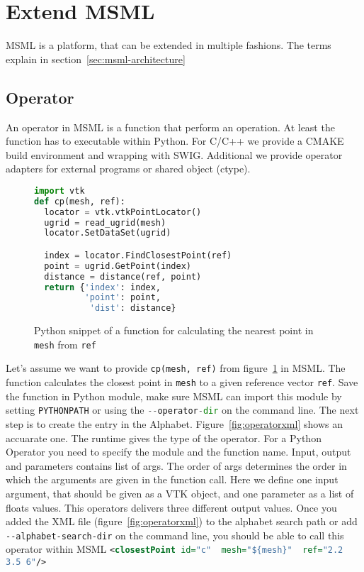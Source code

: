 \section{Extend MSML}
\label{sec:extend}

MSML is a platform, that can be extended in multiple fashions.
The terms explain in section~\ref{sec:msml-architecture}

\subsection{Operator}
\label{sec:operator}

An operator in MSML is a function that perform an operation. At least
the function has to executable within Python. For C/C++ we provide a
CMAKE build environment and wrapping with SWIG. Additional we provide
operator adapters for external programs or shared object (ctype).

\begin{figure}
  \centering
\begin{lstlisting}[language=Python]
import vtk
def cp(mesh, ref):
  locator = vtk.vtkPointLocator()
  ugrid = read_ugrid(mesh)
  locator.SetDataSet(ugrid)

  index = locator.FindClosestPoint(ref)
  point = ugrid.GetPoint(index)
  distance = distance(ref, point)
  return {'index': index,
          'point': point,
           'dist': distance}
\end{lstlisting}
  \caption{Python snippet of a function for calculating the nearest
    point in \texttt{mesh} from \texttt{ref}}
  \label{fig:get_points}
\end{figure}

\begin{figure*}[h]
  \centering
  
  \caption{Operator Definiton Example}
  \label{fig:operatorxml}
\end{figure*}


Let's assume we want to provide
\lstinline[language=Python]{cp(mesh, ref)} from
figure~\ref{fig:get_points} in MSML. The function calculates the
closest point in \lstinline[language=Python]{mesh} to a given
reference vector \lstinline[language=Python]{ref}.
Save the function in Python module, make sure MSML can import this
module by setting \lstinline[language=Python]{PYTHONPATH} or using the
\lstinline[language=Python]{--operator-dir} on the command line.
The next step is to create the entry in the
Alphabet. Figure~\ref{fig:operatorxml} shows an accuarate one.
The runtime gives the type of the operator. For a Python Operator you
need to specify the module and the function name. Input, output and
parameters contains list of args. The order of args determines the
order in which the arguments are given in the function call. Here we
define one input argument, that should be given as a VTK object, and
one parameter as a list of floats values. This operators delivers
three different output values.
Once you added the XML file (figure~\ref{fig:operatorxml}) to the
alphabet search path or add \lstinline{--alphabet-search-dir} on the
command line, you should be able to call this operator within MSML
\lstinline[language=XML]|<closestPoint id="c"  mesh="${mesh}"  ref="2.2 3.5 6"/>|

